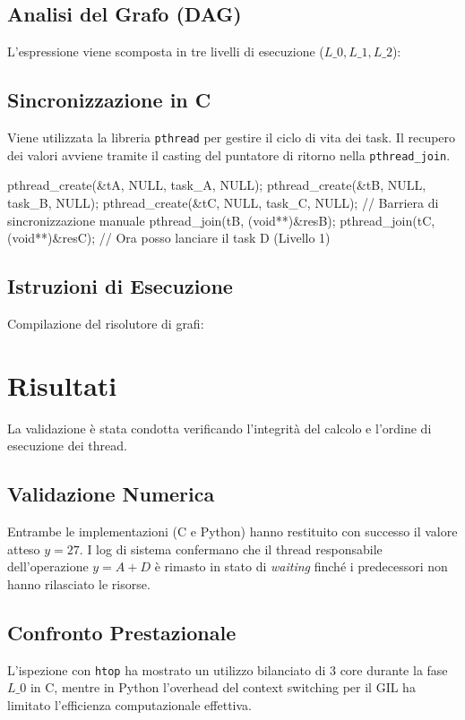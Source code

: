\documentclass[a4paper,12pt]{article}
\begin{document}
\subsection{Analisi del Grafo (DAG)}
L'espressione viene scomposta in tre livelli di esecuzione ($L\_0, L\_1, L\_2$):


\subsection{Sincronizzazione in C}
Viene utilizzata la libreria \texttt{pthread} per gestire il ciclo di vita dei task. Il recupero dei valori avviene tramite il casting del puntatore di ritorno nella \texttt{pthread\_join}.
\begin{ccode}
pthread_create(&tA, NULL, task_A, NULL);
pthread_create(&tB, NULL, task_B, NULL);
pthread_create(&tC, NULL, task_C, NULL);
// Barriera di sincronizzazione manuale
pthread_join(tB, (void**)&resB);
pthread_join(tC, (void**)&resC);
// Ora posso lanciare il task D (Livello 1)
\end{ccode}


\subsection{Istruzioni di Esecuzione}
Compilazione del risolutore di grafi:

\section{Risultati}
La validazione è stata condotta verificando l'integrità del calcolo e l'ordine di esecuzione dei thread.

\subsection{Validazione Numerica}
Entrambe le implementazioni (C e Python) hanno restituito con successo il valore atteso $y = 27$. I log di sistema confermano che il thread responsabile dell'operazione $y = A + D$ è rimasto in stato di \textit{waiting} finché i predecessori non hanno rilasciato le risorse.

\subsection{Confronto Prestazionale}
L'ispezione con \texttt{htop} ha mostrato un utilizzo bilanciato di 3 core durante la fase $L\_0$ in C, mentre in Python l'overhead del context switching per il GIL ha limitato l'efficienza computazionale effettiva.
\end{document}
